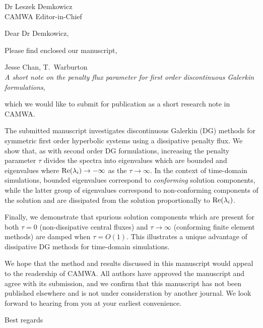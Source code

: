 \documentclass{letter}
\begin{document}
\begin{letter}{Dr Leszek Demkowicz\\CAMWA Editor-in-Chief}


\opening{Dear Dr Demkowicz,}

Please find enclosed our manuscript, 
\begin{center}
Jesse Chan, T.\ Warburton\\
\textit{A short note on the penalty flux parameter for first order discontinuous Galerkin formulations},
\end{center}
which we would like to submit for publication as a short research note in CAMWA.  

The submitted manuscript investigates discontinuous Galerkin (DG) methods for symmetric first order hyperbolic systems using a dissipative penalty flux.  We show that, as with second order DG formulations, increasing the penalty parameter $\tau$ divides the spectra into eigenvalues which are bounded and eigenvalues where ${\rm Re}(\lambda_i)\rightarrow -\infty$ as the $\tau \rightarrow \infty$.  In the context of time-domain simulations, bounded eigenvalues correspond to \emph{conforming} solution components, while the latter group of eigenvalues correspond to non-conforming components of the solution and are dissipated from the solution proportionally to ${\rm Re}(\lambda_i)$.  

Finally, we demonstrate that spurious solution components which are present for both $\tau = 0$ (non-dissipative central fluxes) and $\tau \rightarrow \infty$ (conforming finite element methods) are damped when $\tau = O(1)$.  This illustrates a unique advantage of dissipative DG methods for time-domain simulations.

We hope that the method and results discussed in this manuscript would appeal to the readership of CAMWA.  All authors have approved the manuscript and agree with its submission, and we confirm that this manuscript has not been published elsewhere and is not under consideration by another journal.  We look forward to hearing from you at your earliest convenience.

\closing{Best regards}

\end{letter}
\end{document}
